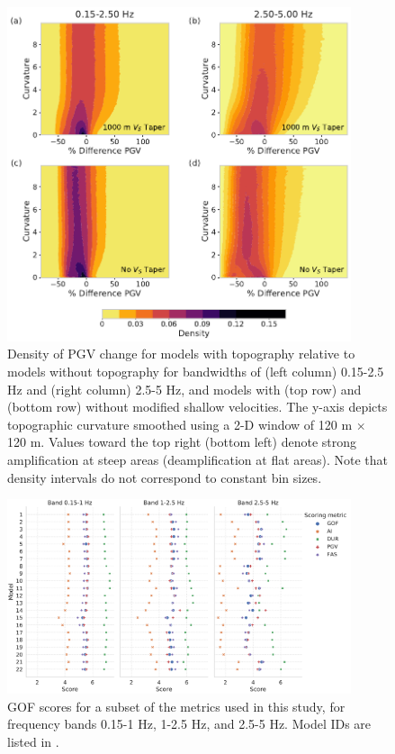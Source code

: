 \begin{figure}[!ht]
  \centering
  \includegraphics[width=0.9\textwidth,height=0.9\textheight,keepaspectratio]{figures/figure_highf_S6.pdf}
  \caption{
  Density of PGV change for models with topography relative to models without topography for bandwidths of (left column) 0.15-2.5 Hz and (right column) 2.5-5 Hz, and models with (top row) and (bottom row) without modified shallow velocities. The y-axis depicts topographic curvature smoothed using a 2-D window of 120 m $\times$ 120 m. Values toward the top right (bottom left) denote strong amplification at steep areas (deamplification at flat areas). Note that density intervals do not correspond to constant bin sizes.
  }
  \label{fig:highf-A6}
\end{figure}
\clearpage

\begin{figure}[!ht]
  \centering
  \includegraphics[width=0.9\textwidth,height=0.9\textheight,keepaspectratio]{figures/GOF_mean_SH1D_tabels.pdf}
  \caption{
  GOF scores for a subset of the metrics used in this study, for frequency bands 0.15-1 Hz, 1-2.5 Hz, and 2.5-5 Hz. Model IDs are listed in .} 
 
  \label{fig:highf-A7}
\end{figure}
\clearpage

